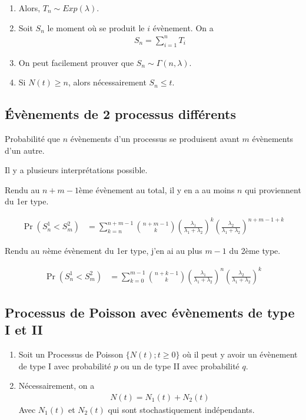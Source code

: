 \documentclass[10pt, french, landscape]{article}
\begin{document}
\begin{multicols*}{2}
\begin{enumerate}[label=\faAngleRight]
\item Alors, $T_n \sim Exp (\lambda)$.

\item Soit $S_n$ le moment où se produit le $i$ évènement. On a
\begin{align*}
S_n = \sum_{i=1}^{n} T_i
\end{align*}
\item On peut facilement prouver que $S_n \sim \Gamma(n, \lambda)$.

\item Si $N(t) \geq n$, alors nécessairement $S_n \leq t$.
\end{enumerate}

\subsection*{Évènements de 2 processus différents}

Probabilité que $n$ évènements d'un processus se produisent avant $m$ évènements d'un autre.

Il y a plusieurs interprétations possible.

Rendu au $n + m - 1$ème évènement au total, il y en a au moins $n$ qui proviennent du 1er type.

\begin{align*}
	\Pr(S_{n}^{1} < S_{m}^{2}) 
	&=	\sum_{k = n}^{n + m - 1} \binom{n + m - 1}{k} \left( \frac{\lambda_{1}}{\lambda_{1} + \lambda_{2}}\right)^{k} \left( \frac{\lambda_{2}}{\lambda_{1} + \lambda_{2}}\right)^{n + m - 1 + k}
\end{align*}

Rendu au $n$ème évènement du 1er type, j'en ai au plus $m - 1$ du 2ème type.

\begin{align*}
	\Pr(S_{n}^{1} < S_{m}^{2}) 
	&=	\sum_{k = 0}^{m - 1} \binom{n + k - 1}{k} \left( \frac{\lambda_{1}}{\lambda_{1} + \lambda_{2}}\right)^{n} \left( \frac{\lambda_{2}}{\lambda_{1} + \lambda_{2}}\right)^{k}
\end{align*}

\subsection*{Processus de Poisson avec évènements de type I et II}
\begin{enumerate}[label=\faAngleRight]
\item Soit un Processus de Poisson $\{N(t) ; t \geq 0 \}$ où il peut y avoir un évènement de type I avec probabilité $p$ ou un de type II avec probabilité $q$.
\item Nécessairement, on a
\begin{align*}
N(t) = N_1(t) + N_2(t)
\end{align*}
Avec $N_1(t)$ et $N_2(t)$ qui sont stochastiquement indépendants.


\end{enumerate}
\end{multicols*}
\end{document}

